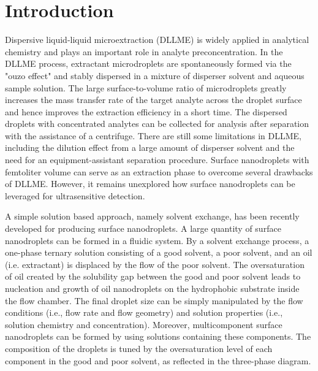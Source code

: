 \documentclass[a4paper,fleqn]{cas-dc}
\begin{document}
\begin{sloppypar}
\section{Introduction}
Dispersive liquid-liquid microextraction (DLLME) is widely applied in analytical chemistry and plays an important role in analyte preconcentration.\cite{vinas2014dispersive,zgola2011dispersive,leong2014beyond,santana2021deep,zgola2010application} In the DLLME process, extractant microdroplets are spontaneously formed via the "ouzo effect" and stably dispersed in a mixture of disperser solvent and aqueous sample solution.\cite{lohse2020physicochemical,qian2019surface,hosseini2020ultrasound,jain2023simple} The large surface-to-volume ratio of microdroplets greatly increases the mass transfer rate of the target analyte across the droplet surface and hence improves the extraction efficiency in a short time.\cite{theberge2010microdroplets,xia2019recent,thakur2021functional} The dispersed droplets with concentrated analytes can be collected for analysis after separation with the assistance of a centrifuge. There are still some limitations in DLLME, including the dilution effect from a large amount of disperser solvent and the need for an equipment-assistant separation procedure.\cite{ojeda2011separation,rezaee2006determination,rezaee2010evolution} Surface nanodroplets with femtoliter volume can serve as an extraction phase to overcome several drawbacks of DLLME. However, it remains unexplored how surface nanodroplets can be leveraged for ultrasensitive detection.  


A simple solution based approach, namely solvent exchange,  has been recently developed for producing surface nanodroplets.  A large quantity of surface nanodroplets can be formed in a fluidic system. By a solvent exchange process, a one-phase ternary solution consisting of a good solvent, a poor solvent, and an oil (i.e. extractant) is displaced by the flow of the poor solvent.\cite{you2021surface,dyett2018growth} The oversaturation of oil created by the solubility gap between the good and poor solvent leads to nucleation and growth of oil nanodroplets on the hydrophobic substrate inside the flow chamber.\cite{zhang2015formation} The final droplet size can be simply manipulated by the flow conditions (i.e., flow rate and flow geometry) and solution properties (i.e., solution chemistry and concentration).\cite{zhang2015formation,lu2015solvent,lu2016influence} Moreover, multicomponent surface nanodroplets can be formed by using solutions containing these components. The composition of the droplets is tuned by the oversaturation level of each component in the good and poor solvent, as reflected in the three-phase diagram.\cite{li2018formation,you2021tuning}                                         


\end{sloppypar}
\end{document}
